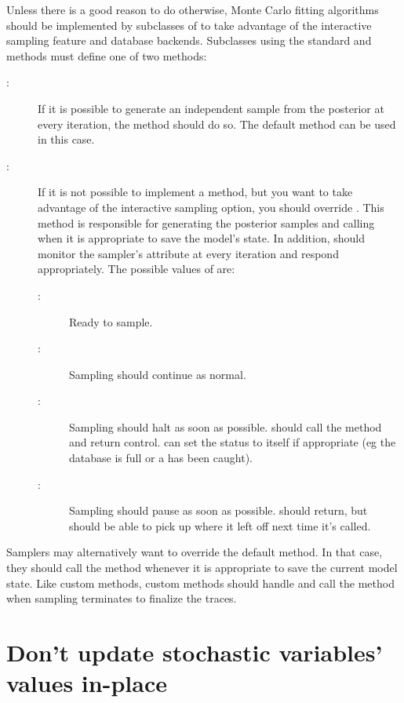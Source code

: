 Unless there is a good reason to do otherwise, Monte Carlo fitting algorithms should be implemented by subclasses of  to take advantage of the interactive sampling feature and database backends. Subclasses using the standard  and  methods must define one of two methods:
\begin{description}
   \item[:] If it is possible to generate an independent sample from the posterior at every iteration, the  method should do so. The default  method can be used in this case.
   \item[:] If it is not possible to implement a  method, but you want to take advantage of the interactive sampling option, you should override . This method is responsible for generating the posterior samples and calling  when it is appropriate to save the model's state. In addition,  should monitor the sampler's  attribute at every iteration and respond appropriately. The possible values of  are:
   \begin{description}
      \item[:] Ready to sample.
      \item[:] Sampling should continue as normal.
      \item[:] Sampling should halt as soon as possible.  should call the  method and return control.  can set the status to  itself if appropriate (eg the database is full or a  has been caught).
      \item[:] Sampling should pause as soon as possible.  should return, but should be able to pick up where it left off next time it's called.
   \end{description}
\end{description}

Samplers may alternatively want to override the default  method. In that case, they should call the  method whenever it is appropriate to save the current model state. Like custom  methods, custom  methods should handle  and call the  method when sampling terminates to finalize the traces.


\section{Don't update stochastic variables' values in-place}
\label{dont-update-indepth}


